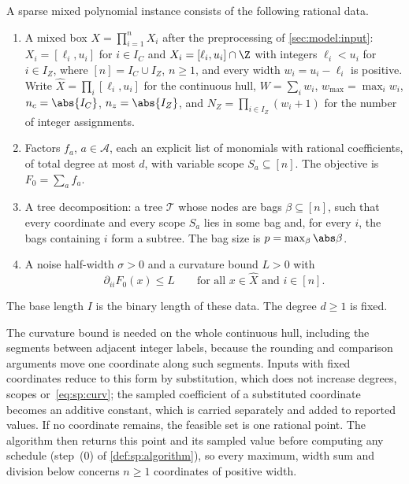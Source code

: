 \begin{definition}\label{def:sp:instance}
A sparse mixed polynomial instance consists of the following rational data.
\begin{enumerate}[label=(\roman*)]
\item A mixed box $X=\prod_{i=1}^nX_i$ after the preprocessing of
\cref{sec:model:input}: $X_i=[\ell_i,u_i]$ for $i\in I_C$ and
$X_i=[\ell_i,u_i]\cap\Z$ with integers $\ell_i<u_i$ for $i\in I_Z$, where
$[n]=I_C\cup I_Z$, $n\ge1$, and every width $w_i=u_i-\ell_i$ is positive. Write
$\widehat X=\prod_i[\ell_i,u_i]$ for the continuous hull,
$W=\sum_iw_i$, $w_{\max}=\max_iw_i$, $n_c=\abs{I_C}$, $n_z=\abs{I_Z}$, and
$N_Z=\prod_{i\in I_Z}(w_i+1)$ for the number of integer assignments.
\item Factors $f_a$, $a\in\mathcal A$, each an explicit list of monomials
with rational coefficients, of total degree at most $d$, with variable scope
$S_a\subseteq[n]$. The objective is $F_0=\sum_af_a$.
\item A tree decomposition: a tree $\mathcal T$ whose nodes are bags
$\beta\subseteq[n]$, such that every coordinate and every scope $S_a$ lies
in some bag and, for every $i$, the bags containing $i$ form a subtree.
The bag size is $p=\max_\beta\abs\beta$.
\item A noise half-width $\sigma>0$ and a curvature bound $L>0$ with
\begin{equation}\label{eq:sp:curv}
 \partial_{ii}F_0(x)\le L\qquad\text{for all }x\in\widehat X\text{ and }i\in[n].
\end{equation}
\end{enumerate}
The base length $I$ is the binary length of these data. The degree $d\ge1$
is fixed.
\end{definition}

The curvature bound is needed on the whole continuous hull, including the
segments between adjacent integer labels, because the rounding and
comparison arguments move one coordinate along such segments. Inputs with
fixed coordinates reduce to this form by substitution, which does not
increase degrees, scopes or~\eqref{eq:sp:curv}; the sampled coefficient of a
substituted coordinate becomes an additive constant, which is carried
separately and added to reported values. If no coordinate remains, the
feasible set is one rational point. The algorithm then returns this point
and its sampled value before computing any schedule (step~(0) of
\cref{def:sp:algorithm}), so every maximum, width sum and division below
concerns $n\ge1$ coordinates of positive width.

